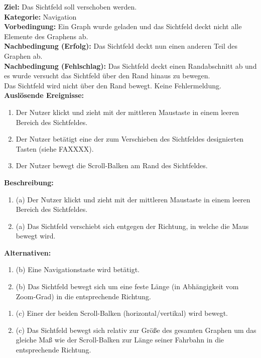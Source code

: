 \label{fa:ziehen} %
\textbf{Ziel:} Das Sichtfeld soll verschoben werden. \\
\textbf{Kategorie:} Navigation \\
\textbf{Vorbedingung:} Ein Graph wurde geladen und das Sichtfeld deckt nicht alle Elemente des Graphens ab. \\
\textbf{Nachbedingung (Erfolg):}  Das Sichtfeld deckt nun einen anderen Teil des Graphen ab.\\
\textbf{Nachbedingung (Fehlschlag):} Das Sichtfeld deckt einen Randabschnitt ab und es wurde versucht das Sichtfeld über den Rand hinaus zu bewegen. \\
Das Sichtfeld wird nicht über den Rand bewegt. Keine Fehlermeldung. \\
\textbf{Auslösende Ereignisse:}
\begin{enumerate}[nolistsep, label=(\alph*)]
  \item Der Nutzer klickt und zieht mit der mittleren Maustaste in einem leeren Bereich des Sichtfeldes.
  \item Der Nutzer betätigt eine der zum Verschieben des Sichtfeldes designierten Tasten (siehe FAXXXX). %
  \item Der Nutzer bewegt die Scroll-Balken am Rand des Sichtfeldes. %
\end{enumerate}
\textbf{Beschreibung:}
\begin{enumerate}[nolistsep]
  \item (a) Der Nutzer klickt und zieht mit der mittleren Maustaste in einem leeren Bereich des Sichtfeldes.
  \item (a) Das Sichtfeld verschiebt sich entgegen der Richtung, in welche die Maus bewegt wird.
\end{enumerate}
\textbf{Alternativen:}
\begin{enumerate}[nolistsep]
  \item (b) Eine Navigationstaste wird betätigt.
  \item (b) Das Sichtfeld bewegt sich um eine feste Länge (in Abhängigkeit vom Zoom-Grad) in die entsprechende Richtung.
\end{enumerate}
\begin{enumerate}[nolistsep]
  \item (c) Einer der beiden Scroll-Balken (horizontal/vertikal) wird bewegt.
  \item (c) Das Sichtfeld bewegt sich relativ zur Größe des gesamten Graphen um das gleiche Maß wie der Scroll-Balken zur Länge seiner Fahrbahn in die entsprechende Richtung.
\end{enumerate}

